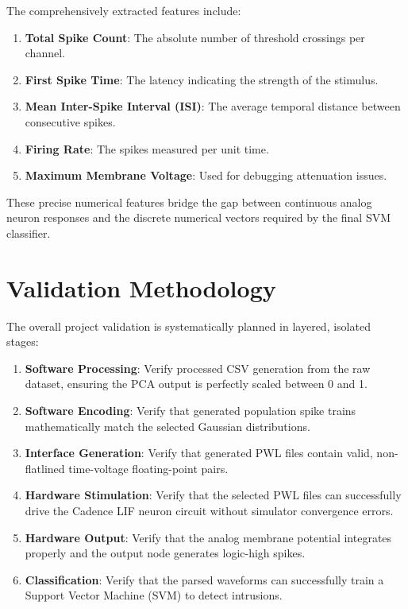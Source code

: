 The comprehensively extracted features include:
\begin{enumerate}
\item \textbf{Total Spike Count}: The absolute number of threshold crossings per channel.
\item \textbf{First Spike Time}: The latency indicating the strength of the stimulus.
\item \textbf{Mean Inter-Spike Interval (ISI)}: The average temporal distance between consecutive spikes.
\item \textbf{Firing Rate}: The spikes measured per unit time.
\item \textbf{Maximum Membrane Voltage}: Used for debugging attenuation issues.
\end{enumerate}

These precise numerical features bridge the gap between continuous analog neuron responses and the discrete numerical vectors required by the final SVM classifier.

\section{Validation Methodology}

The overall project validation is systematically planned in layered, isolated stages:
\begin{enumerate}
\item \textbf{Software Processing}: Verify processed CSV generation from the raw dataset, ensuring the PCA output is perfectly scaled between 0 and 1.
\item \textbf{Software Encoding}: Verify that generated population spike trains mathematically match the selected Gaussian distributions.
\item \textbf{Interface Generation}: Verify that generated PWL files contain valid, non-flatlined time-voltage floating-point pairs.
\item \textbf{Hardware Stimulation}: Verify that the selected PWL files can successfully drive the Cadence LIF neuron circuit without simulator convergence errors.
\item \textbf{Hardware Output}: Verify that the analog membrane potential integrates properly and the output node generates logic-high spikes.
\item \textbf{Classification}: Verify that the parsed waveforms can successfully train a Support Vector Machine (SVM) to detect intrusions.
\end{enumerate}

